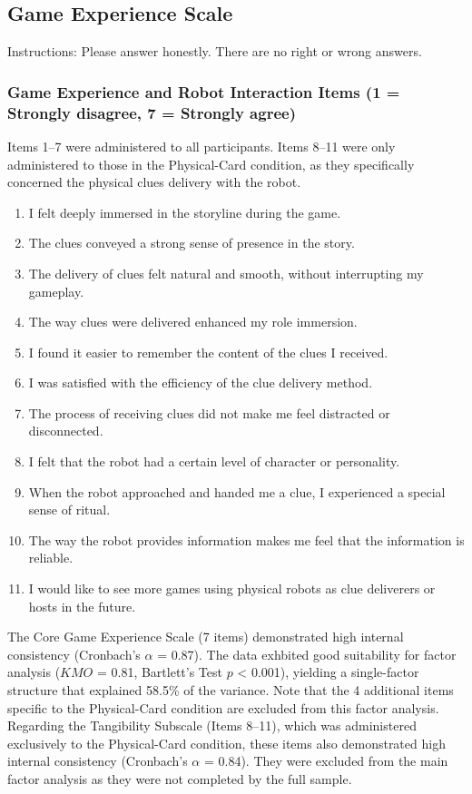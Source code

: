\documentclass[sigconf,screen]{acmart-tagged}
\newcommand{\rev}[1]{#1}
\begin{document}
\subsection{Game Experience Scale}
\label{survey:mmg}
\noindent
Instructions: Please answer honestly. There are no right or wrong answers. 

\subsubsection{Game Experience and Robot Interaction Items  (1 = Strongly disagree, 7 = Strongly agree)} 
\noindent
Items 1–7 were administered to all participants. Items 8–11 were only administered to those in the Physical-Card condition, as they specifically concerned the physical clues delivery with the robot.
\begin{enumerate}
    \item I felt deeply immersed in the storyline during the game.
    \item The clues conveyed a strong sense of presence in the story.
    \item The delivery of clues felt natural and smooth, without interrupting my gameplay.
    \item The way clues were delivered enhanced my role immersion.
    \item I found it easier to remember the content of the clues I received.
    \item I was satisfied with the efficiency of the clue delivery method.
    \item The process of receiving clues did not make me feel distracted or disconnected.
    \item I felt that the robot had a certain level of character or personality.
    \item When the robot approached and handed me a clue, I experienced a special sense of ritual.
    \item The way the robot provides information makes me feel that the information is reliable.
    \item I would like to see more games using physical robots as clue deliverers or hosts in the future.
\end{enumerate}

\rev{The Core Game Experience Scale (7 items) demonstrated high internal consistency (Cronbach's $\alpha$ = 0.87). The data exhbited good suitability for factor analysis ($KMO$ = 0.81, Bartlett's Test $p$ < 0.001), yielding a single-factor structure that explained 58.5\% of the variance. Note that the 4 additional items specific to the Physical-Card condition are excluded from this factor analysis. Regarding the Tangibility Subscale (Items 8--11), which was administered exclusively to the Physical-Card condition, these items also demonstrated high internal consistency (Cronbach's $\alpha$ = 0.84). They were excluded from the main factor analysis as they were not completed by the full sample.}
\end{document}

